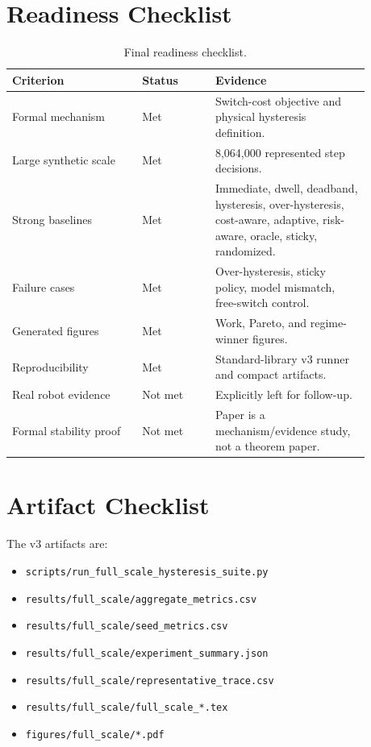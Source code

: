 \documentclass{article}
\begin{document}
\section{Readiness Checklist}

\begin{table}[h]
\centering
\caption{Final readiness checklist.}
\small
\begin{tabular}{p{0.32\linewidth}p{0.18\linewidth}p{0.38\linewidth}}
\toprule
Criterion & Status & Evidence \\
\midrule
Formal mechanism & Met & Switch-cost objective and physical hysteresis definition. \\
Large synthetic scale & Met & 8,064,000 represented step decisions. \\
Strong baselines & Met & Immediate, dwell, deadband, hysteresis, over-hysteresis, cost-aware, adaptive, risk-aware, oracle, sticky, randomized. \\
Failure cases & Met & Over-hysteresis, sticky policy, model mismatch, free-switch control. \\
Generated figures & Met & Work, Pareto, and regime-winner figures. \\
Reproducibility & Met & Standard-library v3 runner and compact artifacts. \\
Real robot evidence & Not met & Explicitly left for follow-up. \\
Formal stability proof & Not met & Paper is a mechanism/evidence study, not a theorem paper. \\
\bottomrule
\end{tabular}
\end{table}

\section{Artifact Checklist}

The v3 artifacts are:
\begin{itemize}
    \item \texttt{scripts/run\_full\_scale\_hysteresis\_suite.py}
    \item \texttt{results/full\_scale/aggregate\_metrics.csv}
    \item \texttt{results/full\_scale/seed\_metrics.csv}
    \item \texttt{results/full\_scale/experiment\_summary.json}
    \item \texttt{results/full\_scale/representative\_trace.csv}
    \item \texttt{results/full\_scale/full\_scale\_*.tex}
    \item \texttt{figures/full\_scale/*.pdf}
\end{itemize}
\end{document}
